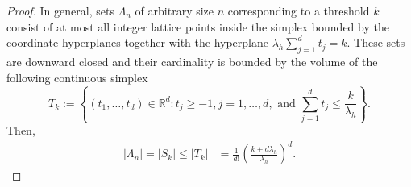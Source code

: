 \documentclass[10pt,a4paper]{amsart}
\begin{document}
\begin{proof}
    In general, sets $\Lambda_n$ of arbitrary size $n$ corresponding to a threshold $k$ consist of at most all integer lattice points inside the simplex bounded by the coordinate hyperplanes together with the hyperplane $\lambda_{h} \sum_{j=1}^d t_j = k$. These sets are downward closed and their cardinality is bounded by the volume of the following continuous simplex
    \begin{equation}
        T_{k}:=\left\{\left(t_1, \ldots, t_d\right) \in \mathbb{R}^d: t_j \geq-1, j=1, \ldots, d, \text { and } \sum_{j=1}^d t_j \leq \frac{k}{\lambda_{h}} \right\}.
    \end{equation}
    Then,
    \begin{align}
        |\Lambda_n|=|S_{k}|\leq\left|T_k\right|&=\frac{1}{d!} \left(\frac{k+d \lambda_h}{\lambda_h}\right)^d.
        \label{set size}
    \end{align}
    

\end{proof}
\end{document}
